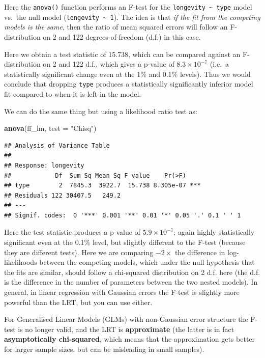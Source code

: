 \documentclass[]{book}
\newenvironment{Shaded}{\begin{snugshade}}{\end{snugshade}}
\newcommand{\KeywordTok}[1]{\textcolor[rgb]{0.13,0.29,0.53}{\textbf{#1}}}
\newcommand{\DataTypeTok}[1]{\textcolor[rgb]{0.13,0.29,0.53}{#1}}
\newcommand{\StringTok}[1]{\textcolor[rgb]{0.31,0.60,0.02}{#1}}
\newcommand{\NormalTok}[1]{#1}
\theoremstyle{definition}
\theoremstyle{definition}
\theoremstyle{definition}
\theoremstyle{remark}
\begin{document}
Here the \texttt{anova()} function performs an F-test for the
\texttt{longevity\ \textasciitilde{}\ type} model vs.~the null model
(\texttt{longevity\ \textasciitilde{}\ 1}). The idea is that \emph{if
the fit from the competing models is the same}, then the ratio of mean
squared errors will follow an F-distribution on 2 and 122
degrees-of-freedom (d.f.) in this case.

Here we obtain a test statistic of 15.738, which can be compared against
an F-distribution on 2 and 122 d.f., which gives a p-value of
\(8.3 \times 10^{-7}\) (i.e.~a statistically significant change even at
the 1\% and 0.1\% levels). Thus we would conclude that dropping
\texttt{type} produces a statistically significantly inferior model fit
compared to when it is left in the model.

We can do the same thing but using a likelihood ratio test as:

\begin{Shaded}
\begin{Highlighting}[]
\KeywordTok{anova}\NormalTok{(ff_lm, }\DataTypeTok{test =} \StringTok{"Chisq"}\NormalTok{)}
\end{Highlighting}
\end{Shaded}

\begin{verbatim}
## Analysis of Variance Table
## 
## Response: longevity
##            Df  Sum Sq Mean Sq F value    Pr(>F)    
## type        2  7845.3  3922.7  15.738 8.305e-07 ***
## Residuals 122 30407.5   249.2                      
## ---
## Signif. codes:  0 '***' 0.001 '**' 0.01 '*' 0.05 '.' 0.1 ' ' 1
\end{verbatim}

Here the test statistic produces a p-value of \(5.9 \times 10^{-7}\);
again highly statistically significant even at the 0.1\% level, but
slightly different to the F-test (because they are different tests).
Here we are comparing \(-2 \times\) the difference in log-likelihoods
between the competing models, which under the null hypothesis that the
fits are similar, should follow a chi-squared distribution on 2 d.f.
here (the d.f. is the difference in the number of parameters between the
two nested models). In general, in linear regression with Gaussian
errors the F-test is slightly more powerful than the LRT, but you can
use either.

For Generalised Linear Models (GLMs) with non-Gaussian error structure
the F-test is no longer valid, and the LRT is \textbf{approximate} (the
latter is in fact \textbf{asymptotically chi-squared}, which means that
the approximation gets better for larger sample sizes, but can be
misleading in small samples).
\end{document}

